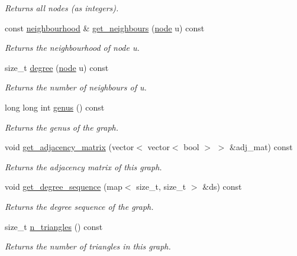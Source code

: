 \begin{DoxyCompactItemize}
\begin{DoxyCompactList}\small\item\em Returns all nodes (as integers). \end{DoxyCompactList}\item 
const \hyperlink{namespacelgraph_1_1utils_a0f2ef47028a466d26841709e705390ac}{neighbourhood} \& \hyperlink{classlgraph_1_1utils_1_1xxgraph_a2c5332c4663c2d52828893f095a68202}{get\-\_\-neighbours} (\hyperlink{namespacelgraph_1_1utils_a7bd66ede3805ef121bc2835bd48de0cf}{node} u) const 
\begin{DoxyCompactList}\small\item\em Returns the neighbourhood of node u. \end{DoxyCompactList}\item 
size\-\_\-t \hyperlink{classlgraph_1_1utils_1_1xxgraph_af588aa4c68004a31aa143024cdb6dcc9}{degree} (\hyperlink{namespacelgraph_1_1utils_a7bd66ede3805ef121bc2835bd48de0cf}{node} u) const 
\begin{DoxyCompactList}\small\item\em Returns the number of neighbours of u. \end{DoxyCompactList}\item 
long long int \hyperlink{classlgraph_1_1utils_1_1xxgraph_ade9c0fcadaa904181d2ea3031488c2e3}{genus} () const 
\begin{DoxyCompactList}\small\item\em Returns the genus of the graph. \end{DoxyCompactList}\item 
\hypertarget{classlgraph_1_1utils_1_1xxgraph_a401454762f6b4b69f13ab0a10729c457}{void \hyperlink{classlgraph_1_1utils_1_1xxgraph_a401454762f6b4b69f13ab0a10729c457}{get\-\_\-adjacency\-\_\-matrix} (vector$<$ vector$<$ bool $>$ $>$ \&adj\-\_\-mat) const }\label{classlgraph_1_1utils_1_1xxgraph_a401454762f6b4b69f13ab0a10729c457}

\begin{DoxyCompactList}\small\item\em Returns the adjacency matrix of this graph. \end{DoxyCompactList}\item 
void \hyperlink{classlgraph_1_1utils_1_1xxgraph_aff73f5ac4cd2732caa0c528eb1c1833c}{get\-\_\-degree\-\_\-sequence} (map$<$ size\-\_\-t, size\-\_\-t $>$ \&ds) const 
\begin{DoxyCompactList}\small\item\em Returns the degree sequence of the graph. \end{DoxyCompactList}\item 
size\-\_\-t \hyperlink{classlgraph_1_1utils_1_1xxgraph_ad4f25a8b29c6f26bc1567cb9c5a564ba}{n\-\_\-triangles} () const 
\begin{DoxyCompactList}\small\item\em Returns the number of triangles in this graph. \end{DoxyCompactList}\end{DoxyCompactItemize}
